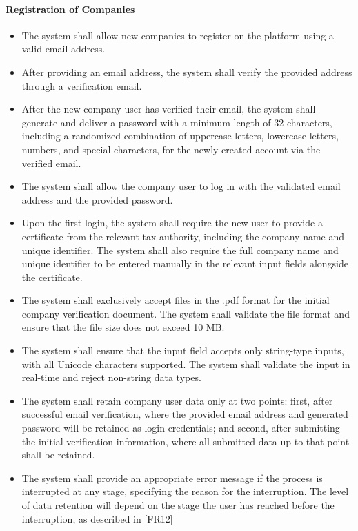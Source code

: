 \paragraph{Registration of Companies}
\begin{itemize}[label={[\textbf{FR}]}, align=left, leftmargin=*]
    \item {} The system shall allow new companies to register on the platform using a valid email address.
    \item {} After providing an email address, the system shall verify the provided address through a verification email.
    \item {} After the new company user has verified their email, the system shall generate and deliver a password with a minimum length of 32 characters, including a randomized combination of uppercase letters, lowercase letters, numbers, and special characters, for the newly created account via the verified email.
    \item {} The system shall allow the company user to log in with the validated email address and the provided password.
    \item {} Upon the first login, the system shall require the new user to provide a certificate from the relevant tax authority, including the company name and unique identifier. The system shall also require the full company name and unique identifier to be entered manually in the relevant input fields alongside the certificate. 
    \item {} The system shall exclusively accept files in the .pdf format for the initial company verification document. The system shall validate the file format and ensure that the file size does not exceed 10 MB.
    \item {} The system shall ensure that the input field accepts only string-type inputs, with all Unicode characters supported. The system shall validate the input in real-time and reject non-string data types.
    \item {} The system shall retain company user data only at two points: first, after successful email verification, where the provided email address and generated password will be retained as login credentials; and second, after submitting the initial verification information, where all submitted data up to that point shall be retained.
    \item {} The system shall provide an appropriate error message if the process is interrupted at any stage, specifying the reason for the interruption. The level of data retention will depend on the stage the user has reached before the interruption, as described in [FR12]
\end{itemize}

